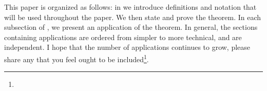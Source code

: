 This paper is organized as follows:
in  we introduce definitions and notation that will be used
throughout the paper. We then state and prove the theorem.
In each subsection of , we present an application of the theorem.
In general, the sections containing applications are ordered from simpler to more technical,
and are independent.
I hope that the number of applications continues to grow,
please share any that you feel
ought to be included\footnote{}.

